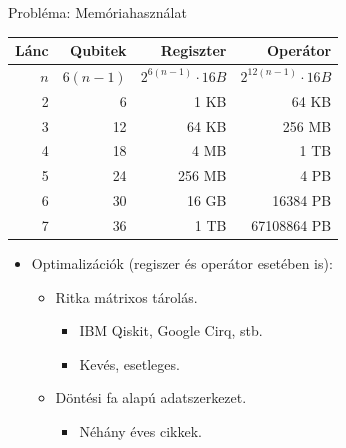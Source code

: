 \documentclass[aspectratio=169]{beamer}
\begin{document}
\begin{frame}[t]{Probléma: Memóriahasználat}
\vspace{2mm}
\begin{tabular}{r|r|r|r}
Lánc & Qubitek & Regiszter & Operátor \\
\hline
\rule{0pt}{1.05\normalbaselineskip} $n$ & $6(n-1)$ & $2^{6(n-1)} \cdot{} 16 B$ & ${2^{12(n-1)}} \cdot{} 16 B$  \pause{} \\
\hline
2 & 6 &  1 KB &  64 KB \\
3 & 12 &  64 KB &  256 MB \\
4 & 18 &  4 MB & \color{red} 1 TB \\
5 & 24 &  256 MB & \color{red} 4 PB \\
6 & 30 &  16 GB & \color{red} 16384 PB \\
7 & 36 & \color{red} 1 TB & \color{red} 67108864 PB
\end{tabular}
\pause
\vspace{2mm}
\begin{itemize}
    \item Optimalizációk (regiszer és operátor esetében is):
    \begin{itemize}
        \item Ritka mátrixos tárolás.
        \begin{itemize}
          \item IBM Qiskit, Google Cirq, stb.
          \item Kevés, esetleges.
        \end{itemize}
        \item Döntési fa alapú adatszerkezet.
        \begin{itemize}
            \item Néhány éves cikkek.
        \end{itemize}
    \end{itemize}
\end{itemize}

\end{frame}

\end{document}
